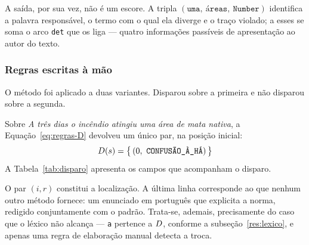 A saída, por sua vez, não é um escore. A tripla
$(\texttt{uma},\ \texttt{áreas},\ \texttt{Number})$ identifica a palavra responsável, o termo
com o qual ela diverge e o traço violado; a esses se soma o arco \texttt{det} que os liga ---
quatro informações passíveis de apresentação ao autor do texto.

\subsubsection{Regras escritas à mão}
\label{res:regras}

O método foi aplicado a duas variantes. Disparou sobre a primeira e não disparou sobre a
segunda.

Sobre \emph{A três dias o incêndio atingiu uma área de mata nativa}, a
Equação~\ref{eq:regras-D} devolveu um único par, na posição inicial:
%
\begin{equation}
D(\sent) = \bigl\{\, (0,\ \texttt{CONFUSÃO\_À\_HÁ}) \,\bigr\}
\end{equation}
%
A Tabela~\ref{tab:disparo} apresenta os campos que acompanham o disparo.

\begin{table}[H]
\centering
{}
\caption{Campos de um disparo do LanguageTool.}
\label{tab:disparo}
\end{table}

O par $(i, r)$ constitui a localização. A última linha corresponde ao que nenhum outro método
fornece: um enunciado em português que explicita a norma, redigido conjuntamente com o padrão.
Trata-se, ademais, precisamente do caso que o léxico não alcança --- \texttt{a} pertence a
$D$, conforme a subseção~\ref{res:lexico}, e apenas uma regra de elaboração manual
detecta a troca.


